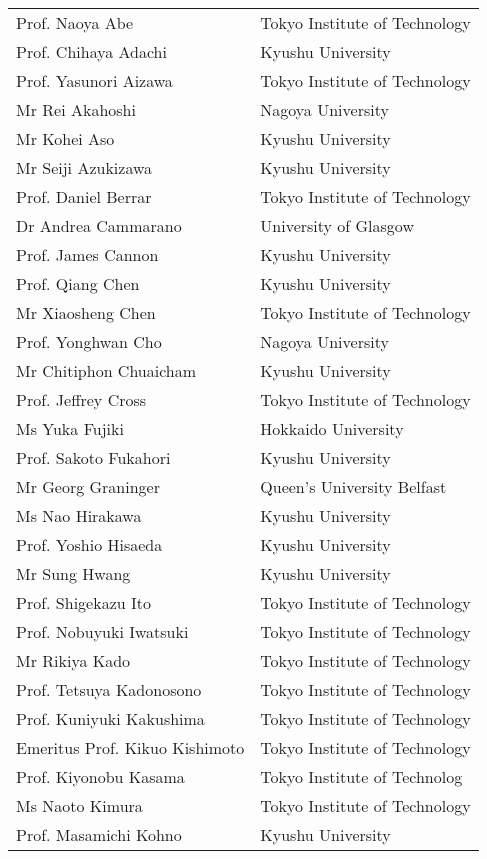 \begin{longtable}{ll}
Prof. Naoya Abe & Tokyo Institute of Technology \\
Prof. Chihaya Adachi & Kyushu University \\
Prof. Yasunori Aizawa & Tokyo Institute of Technology \\
Mr  Rei Akahoshi & Nagoya University \\
Mr  Kohei Aso & Kyushu University \\
Mr  Seiji Azukizawa & Kyushu University \\
Prof. Daniel Berrar & Tokyo Institute of Technology \\
Dr Andrea Cammarano & University of Glasgow \\
Prof. James Cannon & Kyushu University \\
Prof. Qiang Chen & Kyushu University \\
Mr  Xiaosheng Chen & Tokyo Institute of Technology \\
Prof. Yonghwan Cho & Nagoya University \\
Mr  Chitiphon Chuaicham & Kyushu University \\
Prof. Jeffrey Cross & Tokyo Institute of Technology \\
Ms  Yuka Fujiki & Hokkaido University \\
Prof. Sakoto Fukahori & Kyushu University \\
Mr  Georg Graninger & Queen's University Belfast \\
Ms  Nao Hirakawa & Kyushu University \\
Prof. Yoshio Hisaeda & Kyushu University \\
Mr  Sung Hwang & Kyushu University \\
Prof. Shigekazu Ito & Tokyo Institute of Technology \\
Prof. Nobuyuki Iwatsuki & Tokyo Institute of Technology \\
Mr  Rikiya Kado & Tokyo Institute of Technology \\
Prof. Tetsuya Kadonosono & Tokyo Institute of Technology \\
Prof. Kuniyuki Kakushima & Tokyo Institute of Technology \\
Emeritus Prof. Kikuo Kishimoto & Tokyo Institute of Technology \\
Prof. Kiyonobu Kasama & Tokyo Institute of Technolog \\
Ms  Naoto Kimura & Tokyo Institute of Technology \\
Prof. Masamichi Kohno & Kyushu University \\

\end{longtable}
